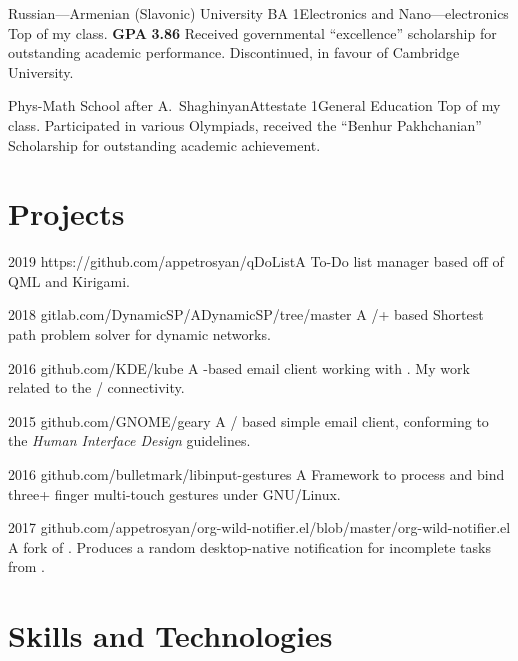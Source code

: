 \documentclass{CurriculumVitae}[10pt, draft, condensed]
\begin{document}
 {Russian---Armenian (Slavonic) University}
{BA 1}{Electronics and Nano---electronics} {Top of my class. \textbf{GPA}
  \textbf{3.86} Received governmental ``excellence'' scholarship for
  outstanding academic performance. Discontinued, in favour of
  Cambridge University.}

 {Phys-Math School after
  A.~Shaghinyan}{Attestate 1}{General Education} {Top of my
  class. Participated in various Olympiads, received the ``Benhur
  Pakhchanian'' Scholarship for outstanding academic achievement. }

\section*{Projects}

 {2019}
{https://github.com/appetrosyan/qDoList}{A To-Do
  list manager based off of QML and Kirigami.}

 {2018}
{gitlab.com/DynamicSP/ADynamicSP/tree/master} {A
  /+ based Shortest path problem solver
  for dynamic networks. }

 {2016} {github.com/KDE/kube} {A -based
  email client working with . My work related to
  the / connectivity. }

 {2015} {github.com/GNOME/geary} {A
  / based simple email client, conforming to
  the  \emph{Human Interface Design} guidelines.}

 {2016}
{github.com/bulletmark/libinput-gestures} {A Framework to process and
  bind three+ finger multi-touch gestures under GNU/Linux. }

 {2017}
{github.com/appetrosyan/org-wild-notifier.el/blob/master/org-wild-notifier.el}
{A fork of . Produces a random desktop-native
  notification for incomplete tasks from . }



\section*{Skills and Technologies}
\end{document}
